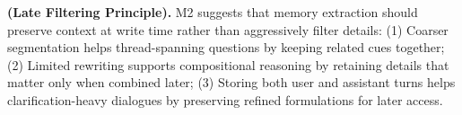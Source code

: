 \documentclass{llmxive}
\providecommand{\hsk}[1]{#1}
\begin{document}

\begin{findingbox}
\textbf{(Late Filtering Principle).}
M2 suggests that memory extraction should preserve context at write time rather than aggressively filter details: 
(1) Coarser segmentation helps thread-spanning questions by keeping related cues together;
(2) Limited rewriting supports compositional reasoning by retaining details that matter only when combined later;
(3) Storing both user and assistant turns helps clarification-heavy dialogues by preserving refined formulations for later access.
\end{findingbox}
\end{document}

